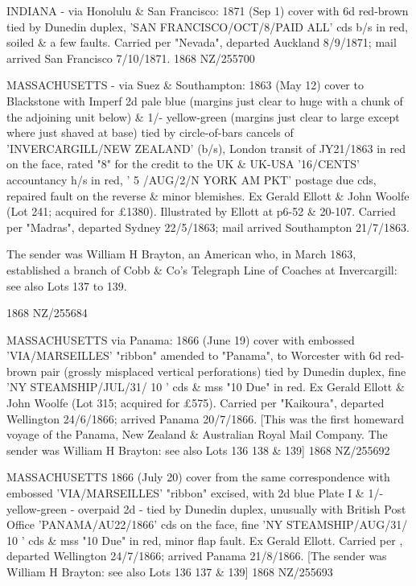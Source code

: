 \documentclass[justified]{tufte-book}
\begin{document}
%
{ INDIANA - via Honolulu \& San Francisco: 1871 (Sep 1) cover with 6d red-brown tied by Dunedin duplex, 'SAN FRANCISCO/OCT/8/PAID ALL' cds b/s in red, soiled \& a few faults. Carried per "Nevada", departed Auckland 8/9/1871; mail arrived San Francisco 7/10/1871.}%
{1868}%
{NZ/255700}%
{}%
{}
{}%
{}

%
{MASSACHUSETTS - via Suez \& Southampton: 1863 (May 12) cover to Blackstone with Imperf 2d pale blue (margins just clear to huge with a chunk of the adjoining unit below) \& 1/- yellow-green (margins just clear to large except where just shaved at base) tied by circle-of-bars cancels of 'INVERCARGILL/NEW ZEALAND' (b/s), London transit of JY21/1863 in red on the face, rated "8" for the credit to the UK \& UK-USA '16/CENTS' accountancy h/s in red, ' 5 /AUG/2/N YORK AM PKT' postage due cds, repaired fault on the reverse \& minor blemishes. Ex Gerald Ellott \& John Woolfe (Lot 241; acquired for £1380). Illustrated by Ellott at p6-52 \& 20-107. Carried per "Madras", departed Sydney 22/5/1863; mail arrived Southampton 21/7/1863. 

The sender was William H Brayton, an American who, in March 1863, established a branch of Cobb \& Co's Telegraph Line of Coaches at Invercargill: see also Lots 137 to 139.}%
{1868}%
{NZ/255684}%
{}%
{}
{}%
{}

%
{MASSACHUSETTS via Panama: 1866 (June 19) cover with embossed 'VIA/MARSEILLES' "ribbon" amended to "Panama", to Worcester with 6d red-brown pair (grossly misplaced vertical perforations) tied by Dunedin duplex, fine 'NY STEAMSHIP/JUL/31/ 10 ' cds \& mss "10 Due" in red. Ex Gerald Ellott \& John Woolfe (Lot 315; acquired for £575). Carried per "Kaikoura", departed Wellington 24/6/1866; arrived Panama 20/7/1866. [This was the first homeward voyage of the Panama, New Zealand \& Australian Royal Mail Company. The sender was William H Brayton: see also Lots 136 138 \& 139]}%
{1868}%
{NZ/255692}%
{}%
{}
{}%
{}

%
{MASSACHUSETTS 1866 (July 20) cover from the same correspondence with embossed 'VIA/MARSEILLES' "ribbon" excised, with 2d blue Plate I \& 1/- yellow-green - overpaid 2d - tied by Dunedin duplex, unusually with British Post Office 'PANAMA/AU22/1866' cds on the face, fine 'NY STEAMSHIP/AUG/31/ 10 ' cds \& mss "10 Due" in red, minor flap fault. Ex Gerald Ellott. Carried per , departed Wellington 24/7/1866; arrived Panama 21/8/1866. [The sender was William H Brayton: see also Lots 136 137 \& 139]}%
{1868}%
{NZ/255693}%
{}%
{}
{}%
{}
\end{document}
